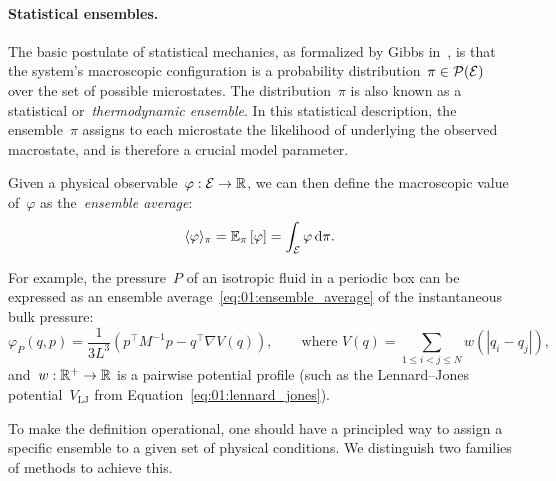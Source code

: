 \paragraph{Statistical ensembles.}
The basic postulate of statistical mechanics, as formalized by Gibbs in~\cite{G02}, is that the system's macroscopic configuration is a probability distribution~${\pi\in\mathcal{P}(\mathcal{E})}$ over the set of possible microstates.
The distribution~$\pi$ is also known as a statistical or~\textit{thermodynamic ensemble}. In this statistical description, the ensemble~$\pi$ assigns to each microstate the likelihood of underlying the observed macrostate, and is therefore a crucial model parameter.

Given a physical observable~$\varphi:\mathcal{E}\to\mathbb{R}$, we can then define the macroscopic value of~$\varphi$ as the~\textit{ensemble average}:
\begin{equation}
    \label{eq:01:ensemble_average}
    \langle \varphi\rangle_{\pi} = \mathbb{E}_\pi\left[\varphi\right]= \int_{\mathcal{E}}\varphi\,\mathrm{d} \pi.
\end{equation}

For example, the pressure~$P$ of an isotropic fluid in a periodic box can be expressed as an ensemble average~\eqref{eq:01:ensemble_average} of the instantaneous bulk pressure:
\begin{equation}
    \label{eq:01:pressure}
    \varphi_P(q,p) = \frac{1}{3L^3}\left(p^\top M^{-1}p-q^\top\nabla V(q)\right),\qquad\text{where } V(q) = \sum_{1\leq i<j\leq N} w(|q_i-q_j|),
\end{equation}
and~$w:\mathbb{R}^+\to\mathbb{R}$ is a pairwise potential profile (such as the Lennard--Jones potential~$V_{\mathrm{LJ}}$ from Equation~\eqref{eq:01:lennard_jones}).

To make the definition operational, one should have a principled way to assign a specific ensemble to a given set of physical conditions.
We distinguish two families of methods to achieve this.

